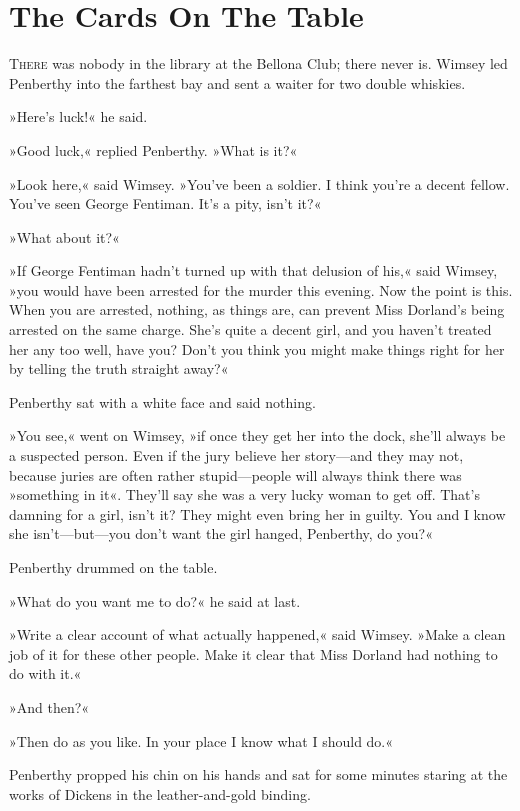 \chapter{The Cards On The Table}

\lettrine[lines=4]{T}{here} was nobody in the library at the Bellona Club; there never is. Wimsey led Penberthy into the farthest bay and sent a waiter for two double whiskies.

»Here's luck!« he said.

»Good luck,« replied Penberthy. »What is it?«

»Look here,« said Wimsey. »You've been a soldier. I think you're a decent fellow. You've seen George Fentiman. It's a pity, isn't it?«

»What about it?«

»If George Fentiman hadn't turned up with that delusion of his,« said Wimsey, »you would have been arrested for the murder this evening. Now the point is this. When you are arrested, nothing, as things are, can prevent Miss Dorland's being arrested on the same charge. She's quite a decent girl, and you haven't treated her any too well, have you? Don't you think you might make things right for her by telling the truth straight away?«

Penberthy sat with a white face and said nothing.

»You see,« went on Wimsey, »if once they get her into the dock, she'll always be a suspected person. Even if the jury believe her story\allowbreak---\allowbreak and they may not, because juries are often rather stupid\allowbreak---\allowbreak people will always think there was »something in it«. They'll say she was a very lucky woman to get off. That's damning for a girl, isn't it? They might even bring her in guilty. You and I know she isn't\allowbreak---\allowbreak but---you don't want the girl hanged, Penberthy, do you?«

Penberthy drummed on the table.

»What do you want me to do?« he said at last.

»Write a clear account of what actually happened,« said Wimsey. »Make a clean job of it for these other people. Make it clear that Miss Dorland had nothing to do with it.«

»And then?«

»Then do as you like. In your place I know what I should do.«

Penberthy propped his chin on his hands and sat for some minutes staring at the works of Dickens in the leather-and-gold binding.


